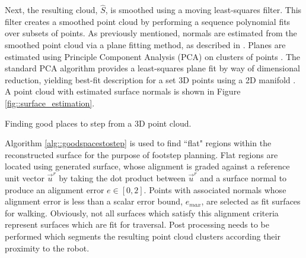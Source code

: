 			Next, the resulting cloud, $\hat{S}$, is smoothed using a moving least-squares filter. This filter creates a smoothed point cloud by performing a sequence polynomial fits over subsets of points. As previously mentioned, normals are estimated from the smoothed point cloud via a plane fitting method, as described in \cite{Mitra2003}. Planes are estimated using Principle Component Analysis (PCA) on clusters of points \cite{Castillo2013}. The standard PCA algorithm provides a least-squares plane fit by way of dimensional reduction, yielding best-fit description for a set 3D points using a 2D manifold \cite{Pearson1901}. A point cloud with estimated surface normals is shown in Figure \ref{fig::surface_estimation}.
			\begin{algorithm}[!h]
				\begin{algorithmic}
						\EndIf
					\EndFor
				\end{algorithmic}	
				\caption{Finding good places to step from a 3D point cloud.}
				\label{alg::goodspacestostep}
			\end{algorithm}
			Algorithm \ref{alg::goodspacestostep} is used to find ``flat" regions within the reconstructed surface for the purpose of footstep planning. Flat regions are located using generated surface, whose alignment is graded against a reference unit vector $\vec{u}^{r}$ by taking the dot product between  $\vec{u}^{r}$ and a surface normal to produce an alignment error $e\in[0,2]$. Points with associated normals whose alignment error is less than a scalar error bound, $e_{max}$, are selected as fit surfaces for walking. Obviously, not all surfaces which satisfy this alignment criteria represent surfaces which are fit for traversal. Post processing needs to be performed which segments the resulting point cloud clusters according their proximity to the robot.

